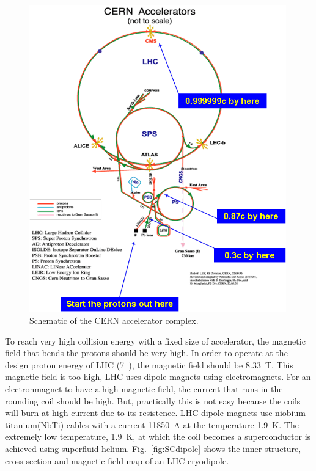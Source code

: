 %
\begin{figure}[ht!] 
\centering 
\includegraphics[width=0.99\textwidth]{figures/Cern-complex.png}
\caption{Schematic of the CERN accelerator complex.} 
\label{fig:cerncomplex} 
\end{figure} 


To reach very high collision energy with a fixed size of accelerator, 
the magnetic field that bends the protons should be very high. 
In order to operate at the design proton energy of LHC (7~\TeV), 
the magnetic field should be 8.33~T. This magnetic field is too high, 
LHC uses dipole magnets using electromagnets. For an electronmagnet 
to have a high magnetic field, the current that runs in the rounding coil 
should be high. But, practically this is not easy because the coils will burn 
at high current due to its resistence. LHC dipole magnets use 
niobium-titanium(NbTi) cables with a current 11850~A at the temperature 1.9~K.
The extremely low temperature, 1.9~K, at which the coil becomes a superconductor
is achieved using superfluid helium.  
Fig.~\ref{fig:SCdipole} shows the inner structure, cross section and magnetic field map of
an LHC cryodipole.

